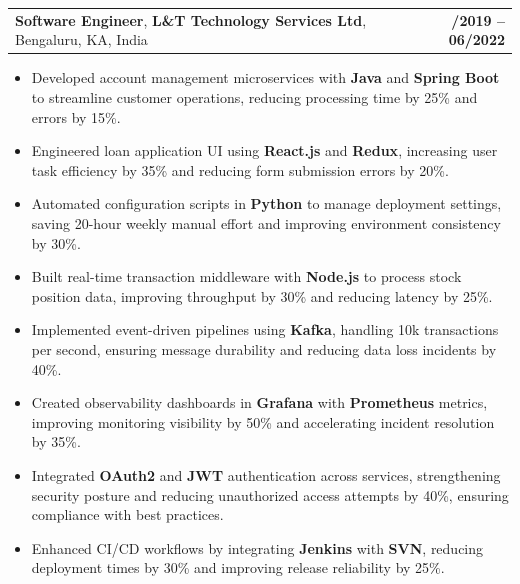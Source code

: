 \documentclass[letterpaper,11pt]{article}
\makeatletter
\newcommand{\resumeItem}[1]{
  \item\footnotesize{
    {#1 \vspace{-2pt}}
  }
}
\newcommand{\resumeSubheading}[4]{
  \vspace{-2pt}\item
    \begin{tabular*}{1.0\textwidth}[t]{l@{\extracolsep{\fill}}r}
      \textbf{\fontsize{10pt}{14pt}\selectfont #3}, \textbf{\fontsize{10pt}{14pt}\selectfont #1}, \fontsize{10pt}{14pt}\selectfont #4 & \textbf{\fontsize{10pt}{14pt}\selectfont #2} \\
    \end{tabular*}\vspace{-7pt}
}
\newcommand{\resumeItemListStart}{\begin{itemize}[leftmargin=*]}
\newcommand{\resumeItemListEnd}{\end{itemize}\vspace{-5pt}}
\makeatother
\begin{document}
    \resumeSubheading
        {L\&T Technology Services Ltd}{08/2019 -- 06/2022}
        {Software Engineer}{Bengaluru, KA, India}
      \resumeItemListStart
        \resumeItem{Developed account management microservices with \textbf{Java} and \textbf{Spring Boot} to streamline customer operations, reducing processing time by 25\% and errors by 15\%.}
        \resumeItem{Engineered loan application UI using \textbf{React.js} and \textbf{Redux}, increasing user task efficiency by 35\% and reducing form submission errors by 20\%.}
        \resumeItem{Automated configuration scripts in \textbf{Python} to manage deployment settings, saving 20-hour weekly manual effort and improving environment consistency by 30\%.}
        \resumeItem{Built real-time transaction middleware with \textbf{Node.js} to process stock position data, improving throughput by 30\% and reducing latency by 25\%.}
        \resumeItem{Implemented event-driven pipelines using \textbf{Kafka}, handling 10k transactions per second, ensuring message durability and reducing data loss incidents by 40\%.}
        \resumeItem{Created observability dashboards in \textbf{Grafana} with \textbf{Prometheus} metrics, improving monitoring visibility by 50\% and accelerating incident resolution by 35\%.}
        \resumeItem{Integrated \textbf{OAuth2} and \textbf{JWT} authentication across services, strengthening security posture and reducing unauthorized access attempts by 40\%, ensuring compliance with best practices.}
        \resumeItem{Enhanced CI/CD workflows by integrating \textbf{Jenkins} with \textbf{SVN}, reducing deployment times by 30\% and improving release reliability by 25\%.}
      \resumeItemListEnd
\end{document}
